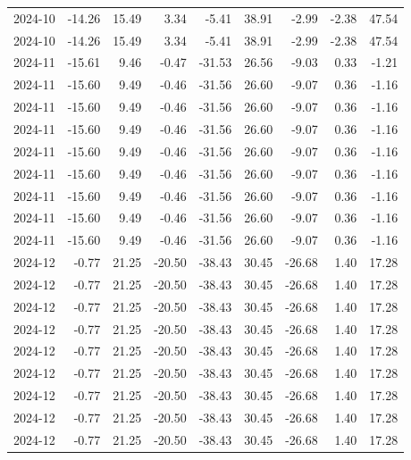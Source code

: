 \begin{table}[ht]
\begin{tabular}{lrrrrrrrr}
  2024-10 & -14.26 & 15.49 & 3.34 & -5.41 & 38.91 & -2.99 & -2.38 & 47.54 \\ 
  2024-10 & -14.26 & 15.49 & 3.34 & -5.41 & 38.91 & -2.99 & -2.38 & 47.54 \\ 
  2024-11 & -15.61 & 9.46 & -0.47 & -31.53 & 26.56 & -9.03 & 0.33 & -1.21 \\ 
  2024-11 & -15.60 & 9.49 & -0.46 & -31.56 & 26.60 & -9.07 & 0.36 & -1.16 \\ 
  2024-11 & -15.60 & 9.49 & -0.46 & -31.56 & 26.60 & -9.07 & 0.36 & -1.16 \\ 
  2024-11 & -15.60 & 9.49 & -0.46 & -31.56 & 26.60 & -9.07 & 0.36 & -1.16 \\ 
  2024-11 & -15.60 & 9.49 & -0.46 & -31.56 & 26.60 & -9.07 & 0.36 & -1.16 \\ 
  2024-11 & -15.60 & 9.49 & -0.46 & -31.56 & 26.60 & -9.07 & 0.36 & -1.16 \\ 
  2024-11 & -15.60 & 9.49 & -0.46 & -31.56 & 26.60 & -9.07 & 0.36 & -1.16 \\ 
  2024-11 & -15.60 & 9.49 & -0.46 & -31.56 & 26.60 & -9.07 & 0.36 & -1.16 \\ 
  2024-11 & -15.60 & 9.49 & -0.46 & -31.56 & 26.60 & -9.07 & 0.36 & -1.16 \\ 
  2024-12 & -0.77 & 21.25 & -20.50 & -38.43 & 30.45 & -26.68 & 1.40 & 17.28 \\ 
  2024-12 & -0.77 & 21.25 & -20.50 & -38.43 & 30.45 & -26.68 & 1.40 & 17.28 \\ 
  2024-12 & -0.77 & 21.25 & -20.50 & -38.43 & 30.45 & -26.68 & 1.40 & 17.28 \\ 
  2024-12 & -0.77 & 21.25 & -20.50 & -38.43 & 30.45 & -26.68 & 1.40 & 17.28 \\ 
  2024-12 & -0.77 & 21.25 & -20.50 & -38.43 & 30.45 & -26.68 & 1.40 & 17.28 \\ 
  2024-12 & -0.77 & 21.25 & -20.50 & -38.43 & 30.45 & -26.68 & 1.40 & 17.28 \\ 
  2024-12 & -0.77 & 21.25 & -20.50 & -38.43 & 30.45 & -26.68 & 1.40 & 17.28 \\ 
  2024-12 & -0.77 & 21.25 & -20.50 & -38.43 & 30.45 & -26.68 & 1.40 & 17.28 \\ 
  2024-12 & -0.77 & 21.25 & -20.50 & -38.43 & 30.45 & -26.68 & 1.40 & 17.28 \\ 
   \hline
\end{tabular}
\end{table}
